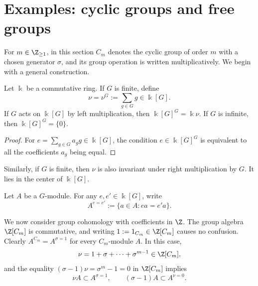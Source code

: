
\section{Examples: cyclic groups and free groups}\label{sec:coh-cyclic-free}
\hypertarget{o014.aljabr2.chapter6.cyclic-and-free-groups}{ }

For $m\in\Z_{\geq1}$, in this section $C_m$ denotes the cyclic group of order
$m$ with a chosen generator $\sigma$, and its group operation is written
multiplicatively. We begin with a general construction.

\begin{definition-proposition}\label{def:group-norm}
	Let $\Bbbk$ be a commutative ring. If $G$ is finite, define
	\[ \nu=\nu^G:=\sum_{g\in G}g\in\Bbbk[G]. \]
	If $G$ acts on $\Bbbk[G]$ by left multiplication, then
	$\Bbbk[G]^G=\Bbbk\nu$. If $G$ is infinite, then
	$\Bbbk[G]^G=\{0\}$.
\end{definition-proposition}
\begin{proof}
	For $e=\sum_{g\in G}a_gg\in\Bbbk[G]$, the condition
	$e\in\Bbbk[G]^G$ is equivalent to all the coefficients $a_g$ being
	equal.
\end{proof}

Similarly, if $G$ is finite, then $\nu$ is also invariant under right
multiplication by $G$. It lies in the center of $\Bbbk[G]$.

\begin{convention}\label{con:G-mod-equalizer}
	Let $A$ be a $G$-module. For any $e,e'\in\Bbbk[G]$, write
	\[ A^{e=e'}:=\{a\in A:ea=e'a\}. \]
\end{convention}

We now consider group cohomology with coefficients in $\Z$. The group algebra
$\Z[C_m]$ is commutative, and writing $1:=1_{C_m}\in\Z[C_m]$ causes no
confusion. Clearly $A^{C_m}=A^{\sigma=1}$ for every $C_m$-module $A$. In
this case,
\begin{equation*}
	\nu=1+\sigma+\cdots+\sigma^{m-1}\in\Z[C_m],
\end{equation*}
and the equality $(\sigma-1)\nu=\sigma^m-1=0$ in $\Z[C_m]$ implies
\[ \nu A\subset A^{\sigma=1},\qquad
	(\sigma-1)A\subset A^{\nu=0}. \]

